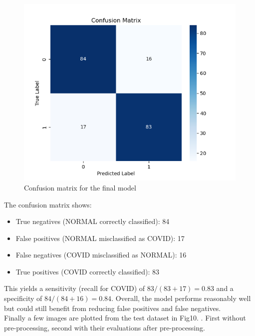 \documentclass[conference]{IEEEtran}
\begin{document}
\begin{figure}[htbp]
	\centerline{\includegraphics[width=\linewidth]{Images/Transferlearning_3.png}}
	\caption{Confusion matrix for the final model}
	\label{fig:transferlearning_3}
\end{figure}

The confusion matrix shows:\\

\begin{itemize}
	\item True negatives (NORMAL correctly classified): 84
	\item False positives (NORMAL misclassified as COVID): 17
	\item False negatives (COVID misclassified as NORMAL): 16
	\item True positives (COVID correctly classified): 83
\end{itemize}

This yields a sensitivity (recall for COVID) of $83/(83+17)=0.83$ and a specificity of $84/(84+16)=0.84$. Overall, the model performs reasonably well but could still benefit from reducing false positives and false negatives. \\ 



Finally a few images are plotted from the test dataset in Fig10. . First without pre-processing, second with their evaluations after pre-processing.\\	
\end{document}
